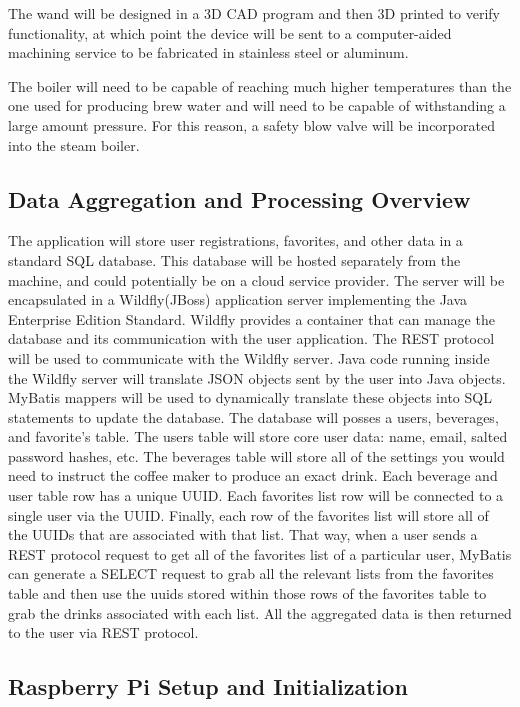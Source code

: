 \documentclass[conference]{IEEEtran}
\begin{document}
The wand will be designed in a 3D CAD program and then 3D printed to verify
functionality, at which point the device will be sent to a computer-aided
machining service to be fabricated in stainless steel or aluminum.

The boiler will need to be capable of reaching much higher temperatures than the
one used for producing brew water and will need to be capable of withstanding a
large amount pressure. For this reason, a safety blow valve will be incorporated
into the steam boiler.

\subsection{Data Aggregation and Processing Overview}
The application will store user registrations, favorites, and other data in a standard SQL database. This database will be hosted separately from the machine, and could potentially be on a cloud service provider. The server will be encapsulated in a Wildfly(JBoss) application server implementing the Java Enterprise Edition Standard. Wildfly provides a container that can manage the database and its communication with the user application. The REST protocol will be used to communicate with the Wildfly server. Java code running inside the Wildfly server will translate JSON objects sent by the user into Java objects. MyBatis mappers will be used to dynamically translate these objects into SQL statements to update the database. The database will posses a users, beverages, and favorite's table. The users table will store core user data: name, email, salted password hashes, etc. The beverages table will store all of the settings you would need to instruct the coffee maker to produce an exact drink. Each beverage and user table row has a unique UUID. Each favorites list row will be connected to a single user via the UUID. Finally, each row of the favorites list will store all of the UUIDs that are associated with that list. That way, when a user sends a REST protocol request to get all of the favorites list of a particular user, MyBatis can generate a SELECT request to grab all the relevant lists from the favorites table and then use the uuids stored within those rows of the favorites table to grab the drinks associated with each list. All the aggregated data is then returned to the user via REST protocol. 

\subsection{Raspberry Pi Setup and Initialization}
\end{document}
